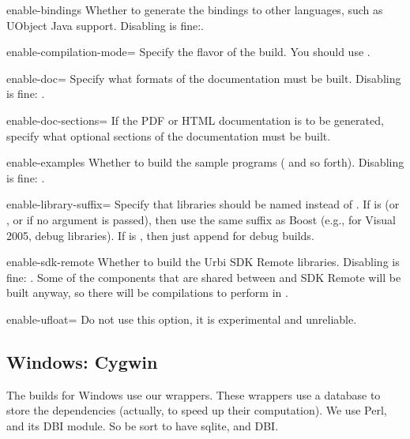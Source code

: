 \begin{options}
\item{enable-bindings} Whether to generate the bindings to other languages,
  such as UObject Java support.  Disabling is
  fine:.
\item{enable-compilation-mode=} Specify the flavor of the build.
  You should use .
\item{enable-doc=} Specify what formats of the documentation
  must be built.  Disabling is fine: .
\item{enable-doc-sections=} If the PDF or HTML documentation
  is to be generated, specify what optional sections of the documentation
  must be built.
\item{enable-examples} Whether to build the sample programs
  ( and so forth).  Disabling is fine:
  .
\item{enable-library-suffix=} Specify that libraries should be
  named  instead of .  If
   is  (or , or if no argument is passed),
  then use the same suffix as Boost (e.g.,  for Visual 2005,
  debug libraries).  If  is , then just append
   for debug builds.
\item{enable-sdk-remote} Whether to build the Urbi SDK Remote libraries.
  Disabling is fine: .  Some of the components
  that are shared between \urbi and SDK Remote will be built anyway, so
  there will be compilations to perform in .
\item{enable-ufloat=} Do not use this option, it is experimental
  and unreliable.
\end{options}


\subsection{Windows: Cygwin}
The builds for Windows use our wrappers.  These wrappers use a database to
store the dependencies (actually, to speed up their computation).  We use
Perl, and its DBI module.  So be sort to have sqlite, and DBI.


